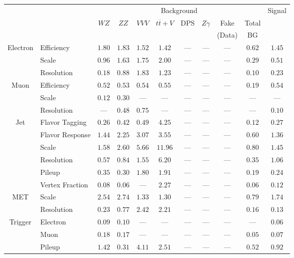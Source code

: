\small
\renewcommand{\tabcolsep}{4pt}
\begin{tabular}{|cl||ccccccc|c||c|}
\hline
 & & \multicolumn{8}{c||}{Background} & Signal\\ 
 & & $WZ$ & $ZZ$ & $VVV$ & $t\overline{t}+V$ & DPS & $Z\gamma$ & Fake & Total & \\ 
 & & &  &  &  &  &  & (Data) & BG & \\ 
\hline\hline
\multirow{3}{*}{Electron}
& Efficiency  & $ 1.80$  & $ 1.83$  & $ 1.52$  & $ 1.42$  & ---  & ---  & ---  & $ 0.62$  & $ 1.45$ \\ 
\cline{2-11}
& Scale  & $ 0.96$  & $ 1.63$  & $ 1.75$  & $ 2.00$  & ---  & ---  & ---  & $ 0.29$  & $ 0.51$ \\ 
\cline{2-11}
& Resolution & $0.18$& $0.88$& $1.83$& $1.23$&  --- &  --- &  --- & $0.10$& $0.23$\\ 
\hline
\multirow{3}{*}{Muon}
& Efficiency & $0.52$& $0.53$& $0.54$& $0.55$&  --- &  --- &  --- & $0.19$& $0.54$\\ 
\cline{2-11}
& Scale & $0.12$& $0.30$&  --- &  --- &  --- &  --- &  --- &  --- &  ---\\ 
\cline{2-11}
& Resolution  & ---  & $ 0.48$  & $ 0.75$  & ---  & ---  & ---  & ---  & ---  & $ 0.10$ \\ 
\hline
\multirow{6}{*}{Jet}
& Flavor Tagging  & $ 0.26$  & $ 0.42$  & $ 0.49$  & $ 4.25$  & ---  & ---  & ---  & $ 0.12$  & $ 0.27$ \\ 
\cline{2-11}
& Flavor Response  & $ 1.44$  & $ 2.25$  & $ 3.07$  & $ 3.55$  & ---  & ---  & ---  & $ 0.60$  & $ 1.36$ \\ 
\cline{2-11}
& Scale  & $ 1.58$  & $ 2.60$  & $ 5.66$  & $ 11.96$  & ---  & ---  & ---  & $ 0.80$  & $ 1.45$ \\ 
\cline{2-11}
& Resolution & $0.57$& $0.84$& $1.55$& $6.20$&  --- &  --- &  --- & $0.35$& $1.06$\\ 
\cline{2-11}
& Pileup  & $ 0.35$  & $ 0.30$  & $ 1.80$  & $ 1.91$  & ---  & ---  & ---  & $ 0.19$  & $ 0.24$ \\ 
\cline{2-11}
& Vertex Fraction & $0.08$& $0.06$&  --- & $2.27$&  --- &  --- &  --- & $0.06$& $0.12$\\ 
\hline
\multirow{2}{*}{MET}
& Scale & $2.54$& $2.74$& $1.33$& $1.30$&  --- &  --- &  --- & $0.79$& $1.74$\\ 
\cline{2-11}
& Resolution & $0.23$& $0.77$& $2.42$& $2.21$&  --- &  --- &  --- & $0.16$& $0.13$\\ 
\hline
\multirow{2}{*}{Trigger}
& Electron & $0.09$& $0.10$&  --- &  --- &  --- &  --- &  --- &  --- & $0.06$\\ 
\cline{2-11}
& Muon & $0.18$& $0.17$&  --- &  --- &  --- &  --- &  --- & $0.05$& $0.07$\\ 
\hline
& Pileup & $1.42$& $0.31$& $4.11$& $2.51$&  --- &  --- &  --- & $0.52$& $0.92$\\ 
\hline
\end{tabular}
